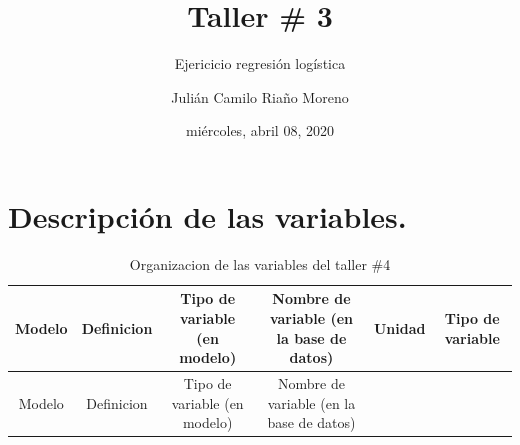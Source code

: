 \documentclass[
]{article}
\title{Taller \# 3}
\subtitle{Ejericicio regresión logística}
\author{Julián Camilo Riaño Moreno}
\date{miércoles, abril 08, 2020}
\begin{document}
\maketitle

{
\setcounter{tocdepth}{3}
\tableofcontents
}
\pagebreak

\hypertarget{descripciuxf3n-de-las-variables.}{%
\section{Descripción de las
variables.}\label{descripciuxf3n-de-las-variables.}}

\begin{longtable}[]{@{}cccccc@{}}
\caption{Organizacion de las variables del taller \#4}\tabularnewline
\toprule
\begin{minipage}[b]{0.07\columnwidth}\centering
Modelo\strut
\end{minipage} & \begin{minipage}[b]{0.13\columnwidth}\centering
Definicion\strut
\end{minipage} & \begin{minipage}[b]{0.17\columnwidth}\centering
Tipo de variable (en modelo)\strut
\end{minipage} & \begin{minipage}[b]{0.18\columnwidth}\centering
Nombre de variable (en la base de datos)\strut
\end{minipage} & \begin{minipage}[b]{0.15\columnwidth}\centering
Unidad\strut
\end{minipage} & \begin{minipage}[b]{0.13\columnwidth}\centering
Tipo de variable\strut
\end{minipage}\tabularnewline
\midrule
\endfirsthead
\toprule
\begin{minipage}[b]{0.07\columnwidth}\centering
Modelo\strut
\end{minipage} & \begin{minipage}[b]{0.13\columnwidth}\centering
Definicion\strut
\end{minipage} & \begin{minipage}[b]{0.17\columnwidth}\centering
Tipo de variable (en modelo)\strut
\end{minipage} & \begin{minipage}[b]{0.18\columnwidth}\centering
Nombre de variable (en la base de datos)\strut
\end{minipage} & \begin{minipage}[b]{0.15\columnwidth}\centering

\end{minipage}
\end{longtable}
\end{document}
